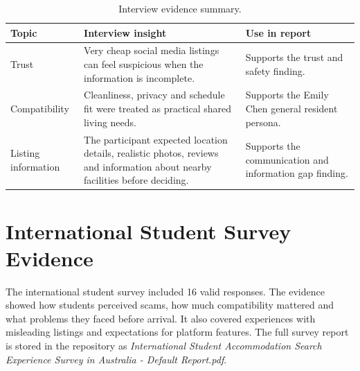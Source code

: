 \documentclass[11pt,a4paper]{article}
\begin{document}
\begin{table}[H]
    \centering
    \small
    \caption{Interview evidence summary.}
    \begin{tabularx}{\textwidth}{@{}L{3.8cm} Y Y@{}}
        \toprule
        Topic & Interview insight & Use in report\\
        \midrule
        Trust & Very cheap social media listings can feel suspicious when the information is incomplete. & Supports the trust and safety finding.\\
        Compatibility & Cleanliness, privacy and schedule fit were treated as practical shared living needs. & Supports the Emily Chen general resident persona.\\
        Listing information & The participant expected location details, realistic photos, reviews and information about nearby facilities before deciding. & Supports the communication and information gap finding.\\
        \bottomrule
    \end{tabularx}
\end{table}

\section{International Student Survey Evidence}

The international student survey included 16 valid responses. The evidence showed how students perceived scams, how much compatibility mattered and what problems they faced before arrival. It also covered experiences with misleading listings and expectations for platform features. The full survey report is stored in the repository as \textit{International Student Accommodation Search Experience Survey in Australia - Default Report.pdf}.
\end{document}
